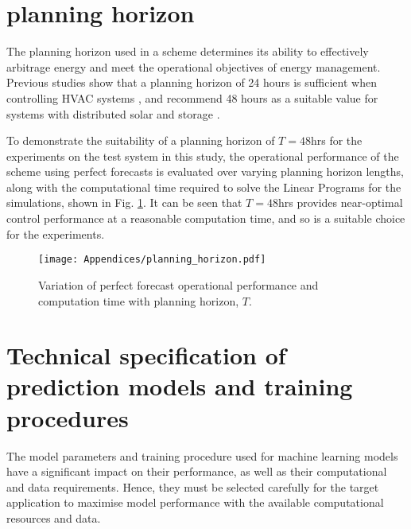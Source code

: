 \begin{subappendices}
    \newpage
    \section{ planning horizon} \label{app:forecasting-tau}


    The planning horizon used in a  scheme determines its ability to effectively arbitrage energy and meet the operational objectives of energy management. Previous studies show that a planning horizon of 24 hours is sufficient when controlling HVAC systems \citep{oldewurtel2012UseModelPredictive}, and recommend 48 hours as a suitable value for systems with distributed solar and storage \citep{thieblemont2017PredictiveControlStrategies}.

    To demonstrate the suitability of a planning horizon of $T=48$hrs for the experiments on the test system in this study, the operational performance of the  scheme using perfect forecasts is evaluated over varying planning horizon lengths, along with the computational time required to solve the Linear Programs for the simulations, shown in Fig. \ref{fig:forecasting-planning-horizon}. It can be seen that $T=48$hrs provides near-optimal control performance at a reasonable computation time, and so is a suitable choice for the experiments.\\

    \begin{figure}[h]
        \centering
        \texttt{[image: Appendices/planning\_horizon.pdf]}
        \caption{Variation of perfect forecast  operational performance and computation time with planning horizon, $T$.}
        \label{fig:forecasting-planning-horizon}
    \end{figure}


    \newpage
    \section{Technical specification of prediction models and training procedures} \label{app:forecasting-models}


    The model parameters and training procedure used for machine learning models have a significant impact on their performance, as well as their computational and data requirements. Hence, they must be selected carefully for the target application to maximise model performance with the available computational resources and data.


\end{subappendices}
